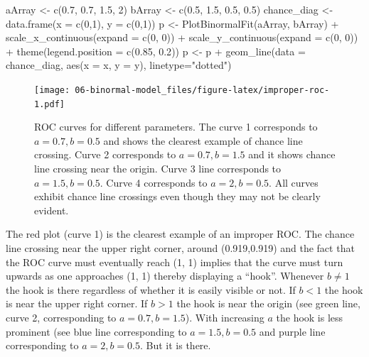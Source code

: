 \documentclass[
]{book}
\newenvironment{Shaded}{\begin{snugshade}}{\end{snugshade}}
\newcommand{\AttributeTok}[1]{\textcolor[rgb]{0.77,0.63,0.00}{#1}}
\newcommand{\DecValTok}[1]{\textcolor[rgb]{0.00,0.00,0.81}{#1}}
\newcommand{\FloatTok}[1]{\textcolor[rgb]{0.00,0.00,0.81}{#1}}
\newcommand{\FunctionTok}[1]{\textcolor[rgb]{0.00,0.00,0.00}{#1}}
\newcommand{\NormalTok}[1]{#1}
\newcommand{\OtherTok}[1]{\textcolor[rgb]{0.56,0.35,0.01}{#1}}
\newcommand{\SpecialCharTok}[1]{\textcolor[rgb]{0.00,0.00,0.00}{#1}}
\newcommand{\StringTok}[1]{\textcolor[rgb]{0.31,0.60,0.02}{#1}}
\begin{document}
\begin{Shaded}
\begin{Highlighting}[]
\NormalTok{  aArray }\OtherTok{\textless{}{-}} \FunctionTok{c}\NormalTok{(}\FloatTok{0.7}\NormalTok{, }\FloatTok{0.7}\NormalTok{, }\FloatTok{1.5}\NormalTok{, }\DecValTok{2}\NormalTok{)}
\NormalTok{  bArray }\OtherTok{\textless{}{-}} \FunctionTok{c}\NormalTok{(}\FloatTok{0.5}\NormalTok{, }\FloatTok{1.5}\NormalTok{, }\FloatTok{0.5}\NormalTok{, }\FloatTok{0.5}\NormalTok{)}
\NormalTok{  chance\_diag }\OtherTok{\textless{}{-}} \FunctionTok{data.frame}\NormalTok{(}\AttributeTok{x =} \FunctionTok{c}\NormalTok{(}\DecValTok{0}\NormalTok{,}\DecValTok{1}\NormalTok{), }\AttributeTok{y =} \FunctionTok{c}\NormalTok{(}\DecValTok{0}\NormalTok{,}\DecValTok{1}\NormalTok{))}
\NormalTok{  p }\OtherTok{\textless{}{-}} \FunctionTok{PlotBinormalFit}\NormalTok{(aArray, bArray) }\SpecialCharTok{+}
    \FunctionTok{scale\_x\_continuous}\NormalTok{(}\AttributeTok{expand =} \FunctionTok{c}\NormalTok{(}\DecValTok{0}\NormalTok{, }\DecValTok{0}\NormalTok{)) }\SpecialCharTok{+} 
    \FunctionTok{scale\_y\_continuous}\NormalTok{(}\AttributeTok{expand =} \FunctionTok{c}\NormalTok{(}\DecValTok{0}\NormalTok{, }\DecValTok{0}\NormalTok{)) }\SpecialCharTok{+}
    \FunctionTok{theme}\NormalTok{(}\AttributeTok{legend.position =} \FunctionTok{c}\NormalTok{(}\FloatTok{0.85}\NormalTok{, }\FloatTok{0.2}\NormalTok{))}
\NormalTok{p }\OtherTok{\textless{}{-}}\NormalTok{ p }\SpecialCharTok{+} \FunctionTok{geom\_line}\NormalTok{(}\AttributeTok{data =}\NormalTok{ chance\_diag, }\FunctionTok{aes}\NormalTok{(}\AttributeTok{x =}\NormalTok{ x, }\AttributeTok{y =}\NormalTok{ y), }\AttributeTok{linetype=}\StringTok{"dotted"}\NormalTok{)}
\end{Highlighting}
\end{Shaded}

\begin{figure}
\centering
\texttt{[image: 06-binormal-model\_files/figure-latex/improper-roc-1.pdf]}
\caption{\label{fig:improper-roc}ROC curves for different parameters. The curve 1 corresponds to \(a = 0.7, b = 0.5\) and shows the clearest example of chance line crossing. Curve 2 corresponds to \(a = 0.7, b = 1.5\) and it shows chance line crossing near the origin. Curve 3 line corresponds to \(a = 1.5, b = 0.5\). Curve 4 corresponds to \(a = 2, b = 0.5\). All curves exhibit chance line crossings even though they may not be clearly evident.}
\end{figure}

The red plot (curve 1) is the clearest example of an improper ROC. The chance line crossing near the upper right corner, around (0.919,0.919) and the fact that the ROC curve must eventually reach (1, 1) implies that the curve must turn upwards as one approaches (1, 1) thereby displaying a ``hook''. Whenever \(b \ne 1\) the hook is there regardless of whether it is easily visible or not. If \(b < 1\) the hook is near the upper right corner. If \(b > 1\) the hook is near the origin (see green line, curve 2, corresponding to \(a = 0.7, b = 1.5\)). With increasing \(a\) the hook is less prominent (see blue line corresponding to \(a = 1.5, b = 0.5\) and purple line corresponding to \(a = 2, b = 0.5\). But it is there.
\end{document}
